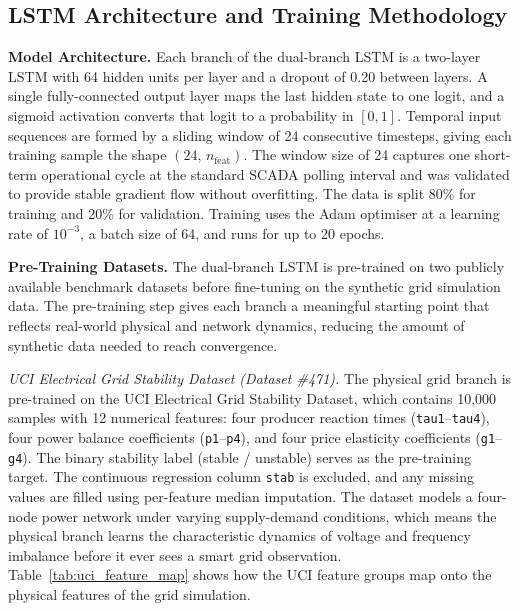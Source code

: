 \subsection{LSTM Architecture and Training Methodology}
\label{sec:lstm_arch_training}

\textbf{Model Architecture.} Each branch of the dual-branch LSTM is a two-layer LSTM with 64 hidden units per layer and a dropout of 0.20 between layers. A single fully-connected output layer maps the last hidden state to one logit, and a sigmoid activation converts that logit to a probability in $[0,1]$. Temporal input sequences are formed by a sliding window of 24 consecutive timesteps, giving each training sample the shape $(24,\, n_{\text{feat}})$. The window size of 24 captures one short-term operational cycle at the standard SCADA polling interval and was validated to provide stable gradient flow without overfitting. The data is split 80\% for training and 20\% for validation. Training uses the Adam optimiser at a learning rate of $10^{-3}$, a batch size of 64, and runs for up to 20 epochs.

\par \vspace{0.35cm}
\noindent
\textbf{Pre-Training Datasets.} The dual-branch LSTM is pre-trained on two publicly available benchmark datasets before fine-tuning on the synthetic grid simulation data. The pre-training step gives each branch a meaningful starting point that reflects real-world physical and network dynamics, reducing the amount of synthetic data needed to reach convergence.

\par \vspace{0.25cm}
\noindent
\textit{UCI Electrical Grid Stability Dataset (Dataset \#471).} The physical grid branch is pre-trained on the UCI Electrical Grid Stability Dataset, which contains 10{,}000 samples with 12 numerical features: four producer reaction times (\texttt{tau1}--\texttt{tau4}), four power balance coefficients (\texttt{p1}--\texttt{p4}), and four price elasticity coefficients (\texttt{g1}--\texttt{g4}). The binary stability label (stable / unstable) serves as the pre-training target. The continuous regression column \texttt{stab} is excluded, and any missing values are filled using per-feature median imputation. The dataset models a four-node power network under varying supply-demand conditions, which means the physical branch learns the characteristic dynamics of voltage and frequency imbalance before it ever sees a smart grid observation. Table~\ref{tab:uci_feature_map} shows how the UCI feature groups map onto the physical features of the grid simulation.

